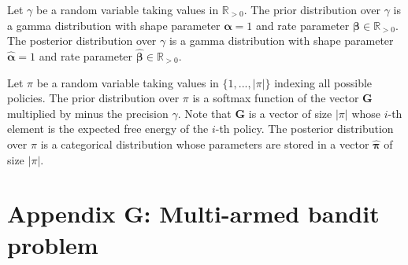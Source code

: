 \documentclass[twoside,11pt]{article}
\begin{document}
\begin{definition}
Let $\gamma$ be a random variable taking values in $\mathbb{R}_{>0}$. The prior distribution over $\gamma$ is a gamma distribution with shape parameter $\bm{\alpha} = 1$ and rate parameter $\bm{\beta} \in \mathbb{R}_{>0}$. The posterior distribution over $\gamma$ is a gamma distribution with shape parameter $\bm{\hat{\alpha}} = 1$ and rate parameter $\bm{\hat{\beta}} \in \mathbb{R}_{>0}$.
\end{definition}

\begin{definition}
Let $\pi$ be a random variable taking values in $\{1, ..., |\pi|\}$ indexing all possible policies. The prior distribution over $\pi$ is a softmax function of the vector $\bm{G}$ multiplied by minus the precision $\gamma$. Note that $\bm{G}$ is a vector of size $|\pi|$ whose $i$-th element is the expected free energy of the $i$-th policy. The posterior distribution over $\pi$ is a categorical distribution whose parameters are stored in a vector $\bm{\hat{\pi}}$ of size $|\pi|$.
\end{definition}


\section*{Appendix G: Multi-armed bandit problem}
\end{document}
